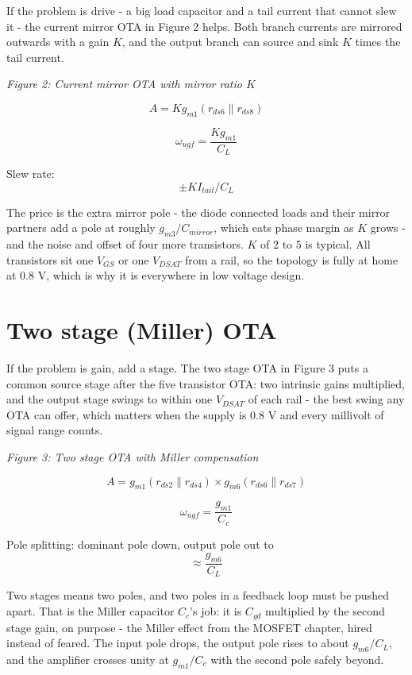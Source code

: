 If the problem is drive - a big load capacitor and a tail current that
cannot slew it - the current mirror OTA in Figure 2 helps. Both branch
currents are mirrored outwards with a gain \(K\), and the output branch
can source and sink \(K\) times the tail current.


{
\centering
{}
}

\emph{Figure 2: Current mirror OTA with mirror ratio \(K\)}

\[ A = K g_{m1} (r_{ds6} \parallel r_{ds8}) \]

\[ \omega_{ugf} = \frac{K g_{m1}}{C_L} \]

Slew rate: \[ \pm K I_{tail} / C_L\]

The price is the extra mirror pole - the diode connected loads and their
mirror partners add a pole at roughly \(g_{m3}/C_{mirror}\), which eats
phase margin as \(K\) grows - and the noise and offset of four more
transistors. \(K\) of 2 to 5 is typical. All transistors sit one
\(V_{GS}\) or one \(V_{DSAT}\) from a rail, so the topology is fully at
home at 0.8 V, which is why it is everywhere in low voltage design.

\section{Two stage (Miller) OTA}\label{two-stage-miller-ota}

If the problem is gain, add a stage. The two stage OTA in Figure 3 puts
a common source stage after the five transistor OTA: two intrinsic gains
multiplied, and the output stage swings to within one \(V_{DSAT}\) of
each rail - the best swing any OTA can offer, which matters when the
supply is 0.8 V and every millivolt of signal range counts.


{
\centering
{}
}

\emph{Figure 3: Two stage OTA with Miller compensation}

\[ A = g_{m1}(r_{ds2} \parallel r_{ds4}) \times g_{m6}(r_{ds6} \parallel r_{ds7}) \]

\[ \omega_{ugf} = \frac{g_{m1}}{C_c} \]

Pole splitting: dominant pole down, output pole out to
\[\approx \frac{g_{m6}}{C_L}\]

Two stages means two poles, and two poles in a feedback loop must be
pushed apart. That is the Miller capacitor \(C_c\)'s job: it is
\(C_{gd}\) multiplied by the second stage gain, on purpose - the Miller
effect from the MOSFET chapter, hired instead of feared. The input pole
drops, the output pole rises to about \(g_{m6}/C_L\), and the amplifier
crosses unity at \(g_{m1}/C_c\) with the second pole safely beyond.

